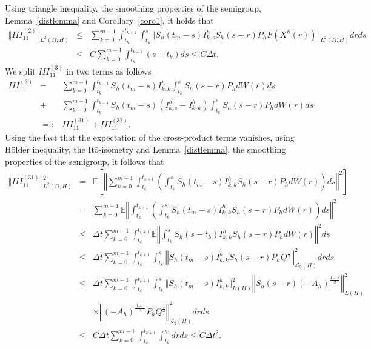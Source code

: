 \documentclass[review,12pt]{elsarticle}
\newcommand{\lemref}[1]{{Lemma~\ref{#1}}}
\newcommand{\coref}[1]{{Corollary~\ref{#1}}}
\begin{document}
Using triangle inequality, the smoothing properties of the semigroup, \lemref{distlemma} and \coref{coro1}, it holds that
\begin{eqnarray}
\label{Taylor6}
\Vert III_{11}^{(2)}\Vert_{L^2(\Omega,H)}&\leq& \sum_{k=0}^{m-1}\int_{t_k}^{t_{k+1}}\int_{t_k}^s\Vert S_h(t_m-s)I^h_{k,s}S_h(s-r)P_hF(X^h(r))\Vert_{L^2(\Omega,H)}drds\nonumber\\
&\leq& C\sum_{k=0}^{m-1}\int_{t_k}^{t_{k+1}}(s-t_k)ds\leq C\Delta t.
\end{eqnarray}
We split $III_{11}^{(3)}$ in two terms as follows
\begin{eqnarray}
\label{Raphael1}
III_{11}^{(3)}&=&\sum_{k=0}^{m-1}\int_{t_k}^{t_{k+1}}S_h(t_m-s)I^h_{k,k}\int_{t_k}^sS_h(s-r)P_hdW(r)ds\nonumber\\
&+&\sum_{k=0}^{m-1}\int_{t_k}^{t_{k+1}}S_h(t_m-s)\left(I^h_{k,s}-I^h_{k,k}\right)\int_{t_k}^sS_h(s-r)P_hdW(r)ds\nonumber\\
&=:&III_{11}^{(31)}+III_{11}^{(32)}.
\end{eqnarray}
Using the fact that the expectation of the cross-product terms vanishes, using H\"{o}lder inequality, the It\^{o}-isometry  and \lemref{distlemma}, the smoothing properties of the semigroup, it follows that
\begin{eqnarray}
\label{Taylor7}
\Vert III_{11}^{(31)}\Vert_{L^2(\Omega,H)}^2&=&\mathbb{E}
\left[\left\Vert\sum_{k=0}^{m-1}\int_{t_k}^{t_{k+1}}\left(\int_{t_k}^sS_h(t_m-s)I^h_{k,k}S_h(s-r)P_hdW(r)\right)ds\right\Vert^2\right]\nonumber\\
&=&\sum_{k=0}^{m-1}\mathbb{E}
\left\Vert\int_{t_k}^{t_{k+1}}\left(\int_{t_k}^sS_h(t_m-s)I^h_{k,k}S_h(s-r)P_hdW(r)\right)ds\right\Vert^2\nonumber\\
&\leq& \Delta t\sum_{k=0}^{m-1}\int_{t_k}^{t_{k+1}}\mathbb{E}\left\Vert\int_{t_k}^sS_h(s-t_k)I^h_{k,k}S_h(s-r)P_hdW(r)\right\Vert^2ds\nonumber\\
&\leq& \Delta t\sum_{k=0}^{m-1}\int_{t_k}^{t_{k+1}}\int_{t_k}^s\left\Vert S_h(t_m-s)I^h_{k,k}S_h(s-r)P_hQ^{\frac{1}{2}}\right\Vert^2_{\mathcal{L}_2(H)}drds\nonumber\\
&\leq& \Delta t\sum_{k=0}^{m-1}\int_{t_k}^{t_{k+1}}\int_{t_k}^s\Vert S_h(t_m-s)I^h_{k,k}\Vert^2_{L(H)}\left\Vert S_h(s-r)(-A_h)^{\frac{1-\beta}{2}}\right\Vert^2_{L(H)}\nonumber\\
&&\times\left\Vert (-A_h)^{\frac{\beta-1}{2}}P_hQ^{\frac{1}{2}}\right\Vert^2_{\mathcal{L}_2(H)}drds\nonumber\\
&\leq& C\Delta t\sum_{k=0}^{m-1}\int_{t_k}^{t_{k+1}}\int_{t_k}^sdrds\leq C\Delta t^2.
\end{eqnarray}
\end{document}
